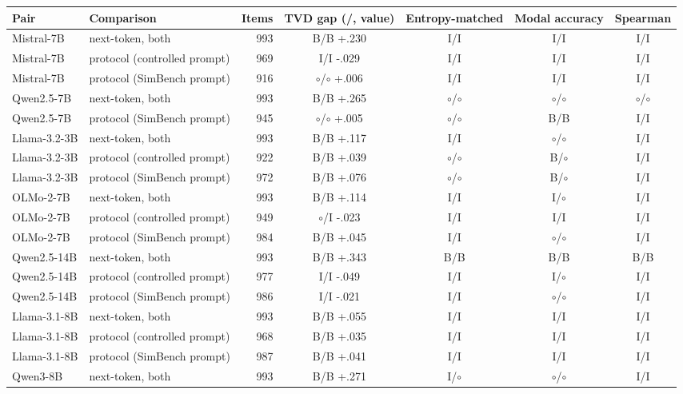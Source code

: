 \begin{table}[t]
\centering\scriptsize
\setlength{\tabcolsep}{3pt}
\begin{tabular}{@{}llrcccc@{}}
\toprule
Pair & Comparison & Items & TVD gap (\ES{}/\PC{}, \PC{} value) & Entropy-matched & Modal accuracy & Spearman \\
\midrule
Mistral-7B & next-token, both & 993 & B/B +.230 & I/I & I/I & I/I \\
Mistral-7B & protocol (controlled prompt) & 969 & I/I -.029 & I/I & I/I & I/I \\
Mistral-7B & protocol (SimBench prompt) & 916 & $\circ$/$\circ$ +.006 & I/I & I/I & I/I \\
Qwen2.5-7B & next-token, both & 993 & B/B +.265 & $\circ$/$\circ$ & $\circ$/$\circ$ & $\circ$/$\circ$ \\
Qwen2.5-7B & protocol (SimBench prompt) & 945 & $\circ$/$\circ$ +.005 & $\circ$/$\circ$ & B/B & I/I \\
Llama-3.2-3B & next-token, both & 993 & B/B +.117 & I/I & $\circ$/$\circ$ & I/I \\
Llama-3.2-3B & protocol (controlled prompt) & 922 & B/B +.039 & $\circ$/$\circ$ & B/$\circ$ & I/I \\
Llama-3.2-3B & protocol (SimBench prompt) & 972 & B/B +.076 & $\circ$/$\circ$ & B/$\circ$ & I/I \\
OLMo-2-7B & next-token, both & 993 & B/B +.114 & I/I & I/$\circ$ & I/I \\
OLMo-2-7B & protocol (controlled prompt) & 949 & $\circ$/I -.023 & I/I & I/I & I/I \\
OLMo-2-7B & protocol (SimBench prompt) & 984 & B/B +.045 & I/I & $\circ$/$\circ$ & I/I \\
Qwen2.5-14B & next-token, both & 993 & B/B +.343 & B/B & B/B & B/B \\
Qwen2.5-14B & protocol (controlled prompt) & 977 & I/I -.049 & I/I & I/$\circ$ & I/I \\
Qwen2.5-14B & protocol (SimBench prompt) & 986 & I/I -.021 & I/I & $\circ$/$\circ$ & I/I \\
Llama-3.1-8B & next-token, both & 993 & B/B +.055 & I/I & I/I & I/I \\
Llama-3.1-8B & protocol (controlled prompt) & 968 & B/B +.035 & I/I & I/I & I/I \\
Llama-3.1-8B & protocol (SimBench prompt) & 987 & B/B +.041 & I/I & I/I & I/I \\
Qwen3-8B & next-token, both & 993 & B/B +.271 & I/$\circ$ & $\circ$/$\circ$ & I/I \\

\end{tabular}
\end{table}
